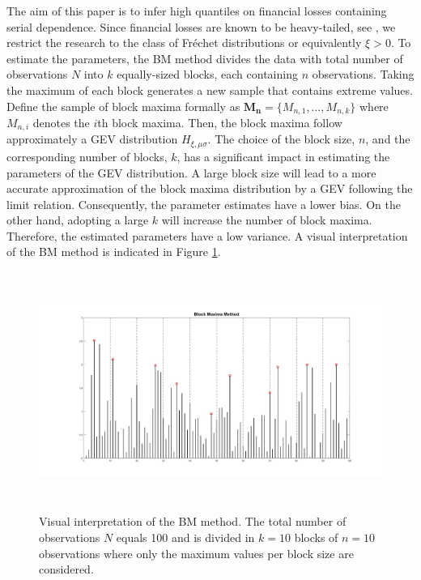 \documentclass[a4paper,12pt]{article}
\theoremstyle{plain}
\begin{document}
The aim of this paper is to infer high quantiles on financial losses containing serial dependence. Since financial losses are known to be heavy-tailed, see , we restrict the research to the class of Fr\'echet distributions or equivalently $\xi>0$. To estimate the parameters, the BM method divides the data with total number of observations $N$ into $k$ equally-sized blocks, each containing $n$ observations. Taking the maximum of each block generates a new sample that contains extreme values. Define the sample of block maxima formally as $\bm{M_n}=\{M_{n,1}, \dots, M_{n,k}\}$ where $M_{n,i}$ denotes the $i$th block maxima. Then, the block maxima follow approximately a GEV distribution $H_{\xi,\mu\sigma}$. The choice of the block size, $n$, and the corresponding number of blocks, $k$, has a significant impact in estimating the parameters of the GEV distribution. A large block size will lead to a more accurate approximation of the block maxima distribution by a GEV following the limit relation. Consequently, the parameter estimates have a lower bias. On the other hand, adopting a large $k$ will increase the number of block maxima. Therefore, the estimated parameters have a low variance. A visual interpretation of the BM method is indicated in Figure \ref{fig:blockmaxima}.

\begin{figure}[H]
\includegraphics[height=7.8cm, width=\linewidth]{Figures/blockmaxima_example2.jpg} 
\caption{Visual interpretation of the BM method. The total number of observations $N$ equals 100 and is divided in $k=10$ blocks of $n=10$ observations where only the maximum values per block size are considered.}
\label{fig:blockmaxima}
\end{figure}
\end{document}
